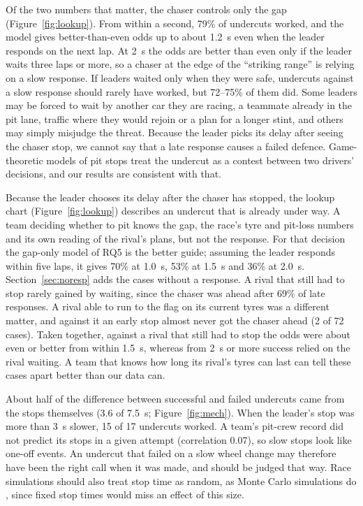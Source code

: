 Of the two numbers that matter, the chaser controls only the gap (Figure~\ref{fig:lookup}). From within a second, 79\% of undercuts worked, and the model gives better-than-even odds up to about 1.2~s even when the leader responds on the next lap. At 2~s the odds are better than even only if the leader waits three laps or more, so a chaser at the edge of the ``striking range'' is relying on a slow response. If leaders waited only when they were safe, undercuts against a slow response should rarely have worked, but 72--75\% of them did. Some leaders may be forced to wait by another car they are racing, a teammate already in the pit lane, traffic where they would rejoin or a plan for a longer stint, and others may simply misjudge the threat. Because the leader picks its delay after seeing the chaser stop, we cannot say that a late response causes a failed defence. Game-theoretic models of pit stops \citep{aguad2024pit} treat the undercut as a contest between two drivers' decisions, and our results are consistent with that.

Because the leader chooses its delay after the chaser has stopped, the lookup chart (Figure~\ref{fig:lookup}) describes an undercut that is already under way. A team deciding whether to pit knows the gap, the race's tyre and pit-loss numbers and its own reading of the rival's plans, but not the response. For that decision the gap-only model of RQ5 is the better guide; assuming the leader responds within five laps, it gives 70\% at 1.0~s, 53\% at 1.5~s and 36\% at 2.0~s. Section~\ref{sec:noresp} adds the cases without a response. A rival that still had to stop rarely gained by waiting, since the chaser was ahead after 69\% of late responses. A rival able to run to the flag on its current tyres was a different matter, and against it an early stop almost never got the chaser ahead (2 of 72 cases). Taken together, against a rival that still had to stop the odds were about even or better from within 1.5~s, whereas from 2~s or more success relied on the rival waiting. A team that knows how long its rival's tyres can last can tell these cases apart better than our data can.

About half of the difference between successful and failed undercuts came from the stops themselves (3.6 of 7.5~s; Figure~\ref{fig:mech}). When the leader's stop was more than 3~s slower, 15 of 17 undercuts worked. A team's pit-crew record did not predict its stops in a given attempt (correlation 0.07), so slow stops look like one-off events. An undercut that failed on a slow wheel change may therefore have been the right call when it was made, and should be judged that way. Race simulations should also treat stop time as random, as Monte Carlo simulations do \citep{heilmeier2020monte}, since fixed stop times would miss an effect of this size.

